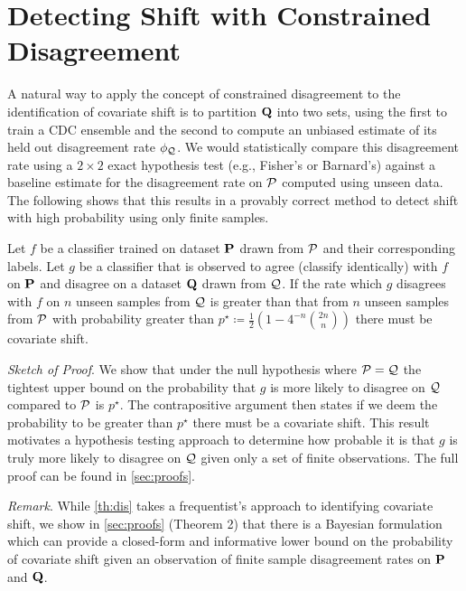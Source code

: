 \section{Detecting Shift with Constrained Disagreement}\label{sec:from-constrained-disagreement-to-detecting-shift-with-hypothesis-tests}
A natural way to apply the concept of constrained disagreement to the identification of covariate shift is
to partition $\mathbf{Q}$ into two sets, using the first to train a CDC ensemble and the second to compute an unbiased estimate
of its held out disagreement rate $\phi_{\mathcal{Q}}$.
We would statistically compare this disagreement rate using a $2\times 2$ exact hypothesis test (e.g., Fisher's or Barnard's) against a baseline estimate for the disagreement rate on $\mathcal{P}$ computed using unseen data.
The following shows that this results in a provably correct method to detect shift with high probability using only finite samples.
\begin{theorem}
    \label{th:dis}
    Let $f$ be a classifier trained on dataset $\mathbf{P}$ drawn from $\mathcal{P}$ and their corresponding labels.
    Let $g$ be a classifier that is observed to agree (classify identically) with $f$ on $\mathbf{P}$ and disagree on a dataset $\mathbf{Q}$ drawn from $\mathcal{Q}$.
    If the rate which $g$ disagrees with $f$ on $n$ unseen samples from $\mathcal{Q}$ is greater than that from $n$ unseen samples from $\mathcal{P}$ with probability greater than $p^\star \coloneqq \frac{1}{2}\left(1- 4^{-n} \binom{2n}{n}\right)$ there must be covariate shift.
\end{theorem}
\textit{Sketch of Proof}.
We show that under the null hypothesis where $\mathcal{P} = \mathcal{Q}$ the tightest upper bound on the probability that $g$ is more likely to disagree on $\mathcal{Q}$ compared to $\mathcal{P}$ is $p^\star$.
The contrapositive argument then states
if we deem the probability to be greater than $p^\star$ there must be a covariate shift.
This result motivates a hypothesis testing approach to determine how probable it is that $g$ is truly more likely to disagree on $\mathcal{Q}$ given only a set of finite observations.
The full proof can be found in \autoref{sec:proofs}.

\textit{Remark}.
While \autoref{th:dis} takes a frequentist's approach to identifying covariate shift, we show in \autoref{sec:proofs} (Theorem 2) that there is a Bayesian formulation which can provide a closed-form and informative lower bound on the probability
of covariate shift given an observation of finite sample disagreement rates on $\mathbf{P}$ and $\mathbf{Q}$.

